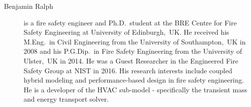 \begin{description}
\item[Benjamin Ralph] is a fire safety engineer and Ph.D.~student at the BRE Centre for Fire Safety Engineering at University of Edinburgh,~UK. He received his M.Eng.~in Civil Engineering from the University of Southampton,~UK in 2008 and his P.G.Dip.~in Fire Safety Engineering from the University of Ulster,~UK in 2014. He was a Guest Researcher in the Engineered Fire Safety Group at NIST in 2016. His research interests include coupled hybrid modeling and performance-based design in fire safety engineering. He is a developer of the HVAC sub-model - specifically the transient mass and energy transport solver.

\end{description}


